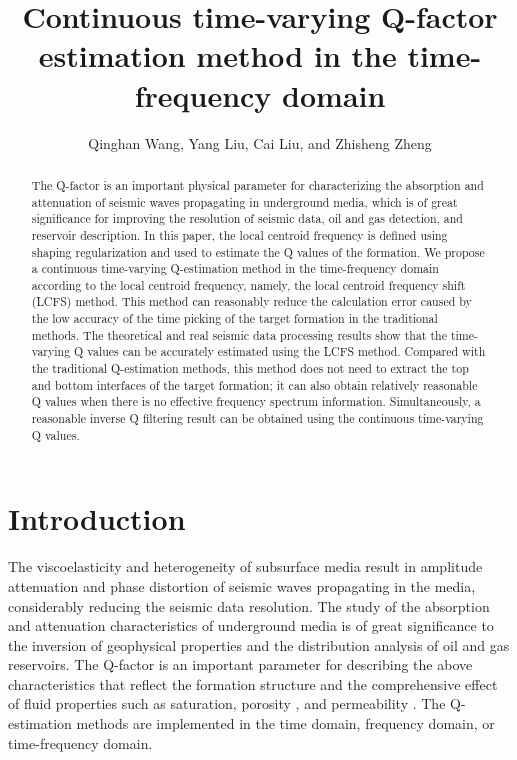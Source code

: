 
\title{Continuous time-varying Q-factor estimation method in the
  time-frequency domain}

\renewcommand{\thefootnote}{\fnsymbol{footnote}}
{}
    
\address{
College of Geo-explorqation Science and Technology,\\
Jilin University \\
No.938 Xi minzhu street \\
Changchun, China, 130026}

\author{Qinghan Wang, Yang Liu, Cai Liu, and Zhisheng Zheng}

\maketitle

\begin{abstract}
  The Q-factor is an important physical parameter for characterizing
  the absorption and attenuation of seismic waves propagating in
  underground media, which is of great significance for improving the
  resolution of seismic data, oil and gas detection, and reservoir
  description. In this paper, the local centroid frequency is defined
  using shaping regularization and used to estimate the Q values of
  the formation. We propose a continuous time-varying Q-estimation
  method in the time-frequency domain according to the local centroid
  frequency, namely, the local centroid frequency shift (LCFS)
  method. This method can reasonably reduce the calculation error
  caused by the low accuracy of the time picking of the target
  formation in the traditional methods. The theoretical and real
  seismic data processing results show that the time-varying Q values
  can be accurately estimated using the LCFS method. Compared with the
  traditional Q-estimation methods, this method does not need to
  extract the top and bottom interfaces of the target formation; it
  can also obtain relatively reasonable Q values when there is no
  effective frequency spectrum information. Simultaneously, a
  reasonable inverse Q filtering result can be obtained using the
  continuous time-varying Q values.
\end{abstract}

\section{Introduction}
The viscoelasticity and heterogeneity of subsurface media result in
amplitude attenuation and phase distortion of seismic waves
propagating in the media, considerably reducing the seismic data
resolution. The study of the absorption and attenuation
characteristics of underground media is of great significance to the
inversion of geophysical properties and the distribution analysis of
oil and gas reservoirs. The Q-factor is an important parameter for
describing the above characteristics that reflect the formation
structure and the comprehensive effect of fluid properties such as
saturation, porosity , and permeability \cite[]{Winkler82}. The
Q-estimation methods are implemented in the time domain, frequency
domain, or time-frequency domain.

